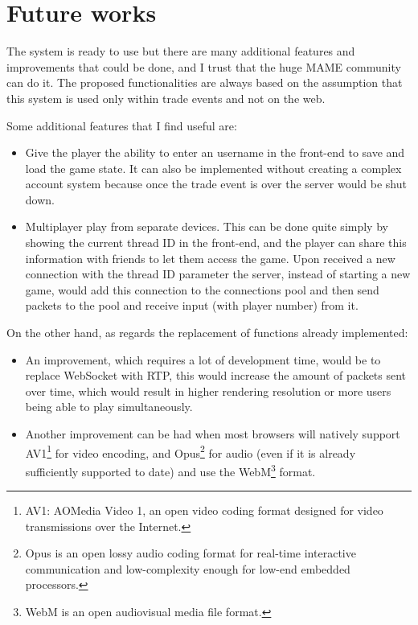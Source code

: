 %
%

\chapter{Future works}

The system is ready to use but there are many additional features and improvements that could be done, and I trust that the huge MAME community can do it. The proposed functionalities are always based on the assumption that this system is used only within trade events and not on the web.

Some additional features that I find useful are:
\begin{itemize}
	\item Give the player the ability to enter an username in the front-end to save and load the game state. It can also be implemented without creating a complex account system because once the trade event is over the server would be shut down.
	\item Multiplayer play from separate devices. This can be done quite simply by showing the current thread ID in the front-end, and the player can share this information with friends to let them access the game. Upon received a new connection with the thread ID parameter the server, instead of starting a new game, would add this connection to the connections pool and then send packets to the pool and receive input (with player number) from it.
\end{itemize}

On the other hand, as regards the replacement of functions already implemented:
\begin{itemize}
	\item An improvement, which requires a lot of development time, would be to replace WebSocket with RTP, this would increase the amount of packets sent over time, which would result in higher rendering resolution or more users being able to play simultaneously.
	\item Another improvement can be had when most browsers will natively support AV1\footnote{AV1: AOMedia Video 1, an open video coding format designed for video transmissions over the Internet.} for video encoding, and Opus\footnote{Opus is an open lossy audio coding format for real-time interactive communication and low-complexity enough for low-end embedded processors.} for audio (even if it is already sufficiently supported to date) and use the WebM\footnote{WebM is an open audiovisual media file format.} format.
\end{itemize}